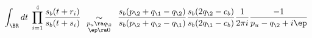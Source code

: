 \begin{equation}
\int_{\BR} dt\;\prod_{i=1}^4\frac{s_b(t+r_i)}{s_b(t+s_i)}\;
\underset{\begin{smallmatrix} p_u\ra q_\2 \\ \ep\ra 0
\end{smallmatrix}}{\sim}\;
\frac{s_b(p_\2+q_\1-q_\2)}{s_b(p_\2+q_\2-q_\1)}
\frac{s_b(2q_\2-c_b)}{s_b(2q_\1-c_b)}
\frac{1}{2\pi i}\frac{-1}{p_u-q_\2+i\ep}\;
\end{equation}

